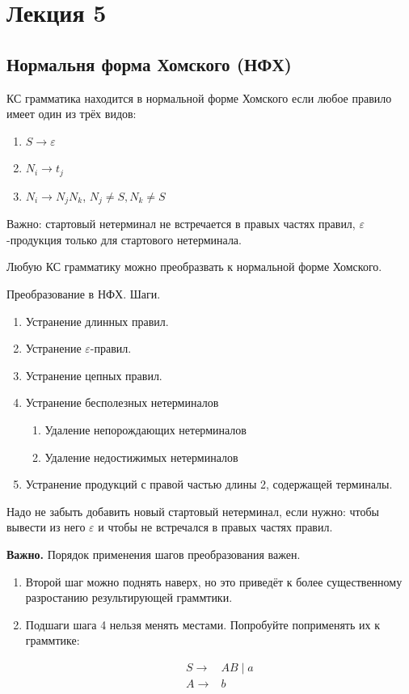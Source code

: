 \section{Лекция 5}
 
\subsection{Нормальня форма Хомского (НФХ)}

\begin{definition}
КС грамматика находится в нормальной форме Хомского если любое правило имеет один из трёх видов:
\begin{enumerate}
    \item $S \to \varepsilon$
    \item $N_i \to t_j$
    \item $N_i \to N_j N_k$, $N_j \neq S, N_k \neq S$
\end{enumerate}
\end{definition}
Важно: стартовый нетерминал не встречается в правых частях правил, $\varepsilon$-продукция только для стартового нетерминала.

\begin{note}
Любую КС грамматику можно преобразвать к нормальной форме Хомского.
\end{note}

Преобразование в НФХ. Шаги.
\begin{enumerate}
    \item Устранение длинных правил.
    \item Устранение $\varepsilon$-правил.
    \item Устранение цепных правил.
    \item Устранение бесполезных нетерминалов
    \begin{enumerate}
        \item Удаление непорождающих нетерминалов
        \item Удаление недостижимых нетерминалов
    \end{enumerate}
    \item Устранение продукций с правой частью длины 2, содержащей терминалы. 
\end{enumerate}

Надо не забыть добавить новый стартовый нетерминал, если нужно: чтобы вывести из него $\varepsilon$ и чтобы не встречался в правых частях правил. 

\textbf{Важно.}
Порядок применения шагов преобразования важен.
\begin{enumerate}
    \item Второй шаг можно поднять наверх, но это приведёт к более существенному разростанию результирующей граммтики.
    \item Подшаги шага 4 нельзя менять местами. Попробуйте поприменять их к граммтике:

\begin{align*}
S \to & A B \mid a \\
A \to & b
\end{align*}
    
\end{enumerate}

